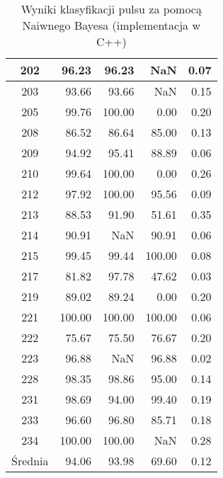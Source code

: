 \begin{table}
\begin{tabular}{|c|r|r|r|r|}
		\hline
		202 & 96.23      & 96.23      & NaN        & 0.07       \\
		\hline
		203 & 93.66      & 93.66      & NaN        & 0.15       \\
		\hline
		205 & 99.76      & 100.00     & 0.00       & 0.20       \\
		\hline
		208 & 86.52      & 86.64      & 85.00      & 0.13       \\
		\hline
		209 & 94.92      & 95.41      & 88.89      & 0.06       \\
		\hline
		210 & 99.64      & 100.00     & 0.00       & 0.26       \\
		\hline
		212 & 97.92      & 100.00     & 95.56      & 0.09       \\
		\hline
		213 & 88.53      & 91.90      & 51.61      & 0.35       \\
		\hline
		214 & 90.91      & NaN        & 90.91      & 0.06       \\
		\hline
		215 & 99.45      & 99.44      & 100.00     & 0.08       \\
		\hline
		217 & 81.82      & 97.78      & 47.62      & 0.03       \\
		\hline
		219 & 89.02      & 89.24      & 0.00       & 0.20       \\
		\hline
		221 & 100.00     & 100.00     & 100.00     & 0.06       \\
		\hline
		222 & 75.67      & 75.50      & 76.67      & 0.20       \\
		\hline
		223 & 96.88      & NaN        & 96.88      & 0.02       \\
		\hline
		228 & 98.35      & 98.86      & 95.00      & 0.14       \\
		\hline
		231 & 98.69      & 94.00      & 99.40      & 0.19       \\
		\hline
		233 & 96.60      & 96.80      & 85.71      & 0.18       \\
		\hline
		234 & 100.00     & 100.00     & NaN        & 0.28       \\
		\hline
		Średnia & 94.06      & 93.98      & 69.60      & 0.12       \\
    \hline
	\end{tabular}
	\caption{Wyniki klasyfikacji pulsu za pomocą Naiwnego Bayesa (implementacja w C++)}
	\label{tab:skutecznosc}	
\end{table}